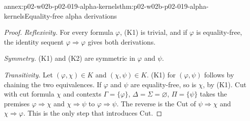 \begin{annexitem}{annex:p02-w02b-p02-019-alpha-kernels}{thm:p02-w02b-p02-019-alpha-kernels}{Equality-free alpha derivations}
\begin{proof}
\emph{Reflexivity.}  For every formula \(\varphi\), (K1) is trivial, and if
\(\varphi\) is equality-free, the identity sequent
\(\varphi\Rightarrow\varphi\) gives both derivations.

\emph{Symmetry.}  (K1) and (K2) are symmetric in \(\varphi\) and \(\psi\).

\emph{Transitivity.}  Let \((\varphi,\chi)\in K\) and \((\chi,\psi)\in K\).
(K1) for \((\varphi,\psi)\) follows by chaining the two equivalences.  If
\(\varphi\) and \(\psi\) are equality-free, so is \(\chi\), by (K1).  Cut
with cut formula \(\chi\) and contexts \(\Gamma=\{\varphi\}\),
\(\Delta=\Sigma=\varnothing\), \(\Pi=\{\psi\}\) takes the premises
\(\varphi\Rightarrow\chi\) and \(\chi\Rightarrow\psi\) to
\(\varphi\Rightarrow\psi\).  The reverse is the Cut of
\(\psi\Rightarrow\chi\) and \(\chi\Rightarrow\varphi\).  This is the only
step that introduces Cut.


\end{proof}
\end{annexitem}
